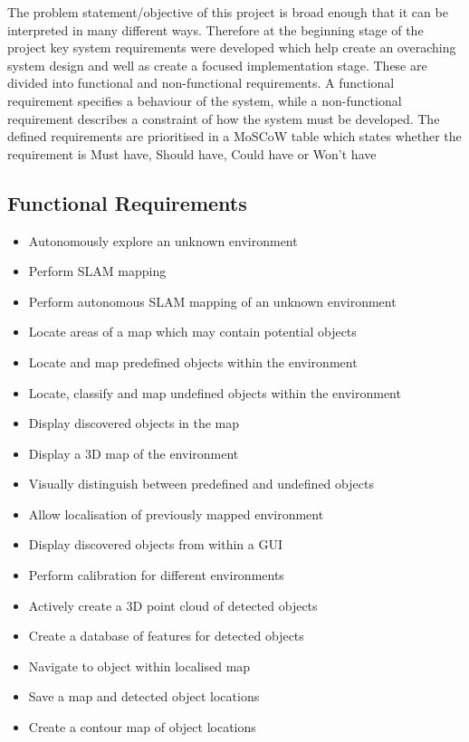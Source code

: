 \documentclass{mproj}
\begin{document}
The problem statement/objective of this project is broad enough that it can be interpreted in many different ways. Therefore at the beginning stage of the project key system requirements were developed which help create an overaching system design and well as create a focused implementation stage. These are divided into functional and non-functional requirements. A functional requirement specifies a behaviour of the system, while a non-functional requirement describes a constraint of how the system must be developed. The defined requirements are prioritised in a MoSCoW table which states whether the requirement is Must have, Should have, Could have or Won’t have

\subsection{Functional Requirements}
\begin{itemize}
\item Autonomously explore an unknown environment
\item Perform SLAM mapping
\item Perform autonomous SLAM mapping of an unknown environment
\item Locate areas of a map which may contain potential objects
\item Locate and map predefined objects within the environment
\item Locate, classify and map undefined objects within the environment
\item Display discovered objects in the map
\item Display a 3D map of the environment
\item Visually distinguish between predefined and undefined objects
\item Allow localisation of previously mapped environment
\item Display discovered objects from within a GUI
\item Perform calibration for different environments
\item Actively create a 3D point cloud of detected objects
\item Create a database of features for detected objects
\item Navigate to object within localised map 
\item Save a map and detected object locations
\item Create a contour map of object locations
\end{itemize}
 
\end{document}
